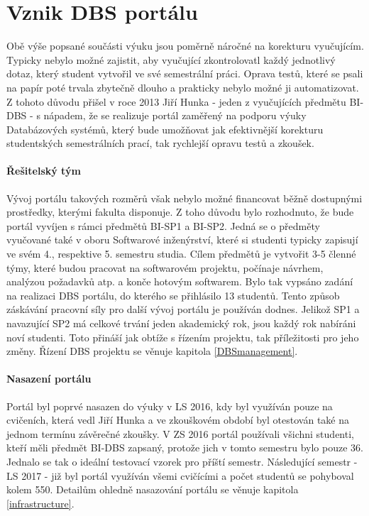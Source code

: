 \section{Vznik DBS portálu} \label{DBSportal:creation}
Obě výše popsané součásti výuku jsou poměrně náročné na korekturu vyučujícím. Typicky nebylo možné zajistit, aby vyučující zkontrolovatl každý jednotlivý dotaz, který student vytvořil ve své semestrální práci. Oprava testů, které se psali na papír poté trvala zbytečně dlouho a prakticky nebylo možné ji automatizovat. Z tohoto důvodu přišel v roce 2013 Jiří Hunka - jeden z vyučujících předmětu BI-DBS - s nápadem, že se realizuje portál zaměřený na podporu výuky Databázových systémů, který bude umožňovat jak efektivnější korekturu studentských semestrálních prací, tak rychlejší opravu testů a zkoušek.

\paragraph{Řešitelský tým}
Vývoj portálu takových rozměrů však nebylo možné financovat běžně dostupnými prostředky, kterými fakulta disponuje. Z toho důvodu bylo rozhodnuto, že bude portál vyvíjen s rámci předmětů BI-SP1 a BI-SP2. Jedná se o předměty vyučované také v oboru Softwarové inženýrství, které si studenti typicky zapisují ve svém 4., respektive 5. semestru studia. Cílem předmětů je vytvořit 3-5 členné týmy, které budou pracovat na softwarovém projektu, počínaje návrhem, analýzou požadavků atp. a konče hotovým softwarem. Bylo tak vypsáno zadání na realizaci DBS portálu, do kterého se přihlásilo 13 studentů.
Tento způsob záskávání pracovní síly pro další vývoj portálu je používán dodnes. Jelikož SP1 a navazující SP2 má celkové trvání jeden akademický rok, jsou každý rok nabíráni noví studenti. Toto přináší jak obtíže s řízením projektu, tak příležitosti pro jeho změny. Řízení DBS projektu se věnuje kapitola \ref{DBSmanagement}.

\paragraph{Nasazení portálu}
Portál byl poprvé nasazen do výuky v LS 2016, kdy byl využíván pouze na cvičeních, která vedl Jiří Hunka a ve zkouškovém období byl otestován také na jednom termínu závěrečné zkoušky.
V ZS 2016 portál používali všichni studenti, kteří měli předmět BI-DBS zapsaný, protože jich v tomto semestru bylo pouze 36. Jednalo se tak o ideální testovací vzorek pro příští semestr. Následující semestr - LS 2017 - již byl portál využíván všemi cvičícími a počet studentů se pohyboval kolem 550. Detailům ohledně nasazování portálu se věnuje kapitola \ref{infrastructure}.
